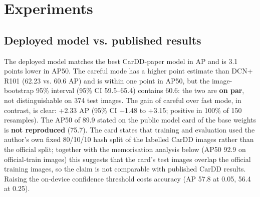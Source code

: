 \documentclass[10pt,twocolumn]{article}
\begin{document}
\section{Experiments}
\subsection{Deployed model vs. published results}
\begin{table}[t]\centering\small\caption{Box detection on the official CarDD test split (374 images). Paper rows are taken from Table IV of the CarDD paper ~\cite{cardd} unless marked; † = split may differ from the official one.}\end{table}
The deployed model matches the best CarDD-paper model in AP and is 3.1 points lower in AP50. The careful mode has a higher point estimate than DCN+ R101 (62.23 vs. 60.6 AP) and is within one point in AP50, but the image-bootstrap 95\% interval (95\% CI 59.5--65.4) contains 60.6: the two are \textbf{on par}, not distinguishable on 374 test images. The gain of careful over fast mode, in contrast, is clear: +2.33 AP (95\% CI +1.48 to +3.15; positive in 100\% of 150 resamples). The AP50 of 89.9 stated on the public model card of the base weights is \textbf{not reproduced} (75.7). The card states that training and evaluation used the author's own fixed 80/10/10 hash split of the labelled CarDD images rather than the official split; together with the memorisation analysis below (AP50 92.9 on official-train images) this suggests that the card's test images overlap the official training images, so the claim is not comparable with published CarDD results. Raising the on-device confidence threshold costs accuracy (AP 57.8 at 0.05, 56.4 at 0.25).
\end{document}

